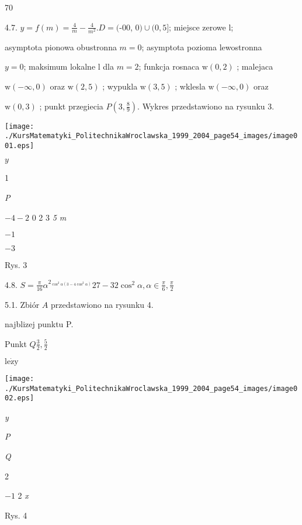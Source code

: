 \documentclass[a4paper,12pt]{article}
\begin{document}
70

4.7. $y = f(m) = \displaystyle \frac{4}{m}-\frac{4}{m^{2}}. D = ($-00, $0)\cup(0,5]$; miejsce zerowe l;

asymptota pionowa obustronna $m = 0$; asymptota pozioma lewostronna

$y=0$; maksimum lokalne l dla $m=2$; funkcja rosnaca $\mathrm{w} (0,2)$ ; malejaca

$\mathrm{w} (-\infty,0)$ oraz $\mathrm{w} (2,5)$ ; wypukla $\mathrm{w} (3,5)$ ; wklesla $\mathrm{w} (-\infty,0)$ oraz

$\mathrm{w}(0,3)$ ; punkt przegiecia $P(3,\displaystyle \frac{8}{9})$. Wykres przedstawiono na rysunku 3.
\begin{center}
\texttt{[image: ./KursMatematyki\_PolitechnikaWroclawska\_1999\_2004\_page54\_images/image001.eps]}
\end{center}
$y$

1

{\it P}

$-4  -2$  0 2 3  {\it 5 m}

$-1$

$-3$

Rys. 3

4.8. $S=\displaystyle \frac{\pi}{16}\alpha^{2_{\cos^{2}\alpha(3-4\cos^{2}\alpha)}}27-32\cos^{2}\alpha, \alpha\in \displaystyle \frac{\pi}{6}, \displaystyle \frac{\pi}{2}$

5.1. Zbiór $A$ przedstawiono na rysunku 4.

najblizej punktu P.

Punkt $Q \displaystyle \frac{3}{2}, \displaystyle \frac{5}{2}$

$\mathrm{l}\mathrm{e}\dot{\mathrm{z}}\mathrm{y}$
\begin{center}
\texttt{[image: ./KursMatematyki\_PolitechnikaWroclawska\_1999\_2004\_page54\_images/image002.eps]}
\end{center}
{\it y}

{\it P}

{\it Q}

2

$-1$  2  {\it x}

Rys. 4
\end{document}
